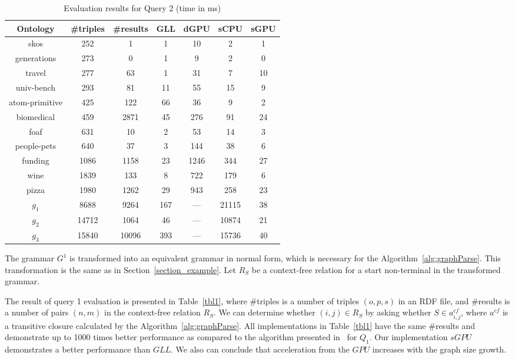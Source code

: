 \begin{table*}[h]
\centering
\caption{Evaluation results for Query 2 (time in ms)}
\label{tbl2}

\begin{tabular}{ | c | c | c | c | c | c | c |}
\hline
Ontology & \#triples & \#results & GLL & dGPU & sCPU & sGPU \\
\hline 
\hline
skos        & 252 & 1 & 1 & 10 & 2 & 1\\
generations & 273 & 0 & 1 & 9 & 2 & 0\\
travel      & 277 & 63 & 1 & 31 & 7 & 10\\
univ-bench  & 293 & 81 & 11 & 55 & 15 & 9\\
atom-primitive & 425 & 122 & 66 & 36 & 9 & 2\\
biomedical & 459 & 2871 & 45 & 276 & 91 & 24\\
foaf        & 631 & 10 & 2 & 53 & 14 & 3\\
people-pets & 640 & 37 & 3 & 144 & 38 & 6\\
funding     & 1086 & 1158 & 23 & 1246 & 344 & 27\\
wine        & 1839 & 133 & 8 & 722 & 179 & 6\\
pizza       & 1980 & 1262 & 29 & 943 & 258 & 23\\
$g_{1}$     & 8688 & 9264 & 167 & --- & 21115 & 38\\
$g_{2}$     & 14712 & 1064 & 46 & --- & 10874 & 21\\
$g_{3}$     & 15840 & 10096 & 393 & --- & 15736 & 40\\
\hline
\end{tabular}

\end{table*}


The grammar $G^1$ is transformed into an equivalent grammar in normal form, which is necessary for the Algorithm~\ref{alg:graphParse}. This transformation is the same as in Section~\ref{section_example}. Let $R_S$ be a context-free relation for a start non-terminal in the transformed grammar.

The result of query 1 evaluation is presented in Table~\ref{tbl1}, where \#triples is a number of triples $(o,p,s)$ in an RDF file, and \#results is a number of pairs $(n,m)$ in the context-free relation $R_S$. We can determine whether $(i,j) \in R_S$ by asking whether $S \in a^{cf}_{i,j}$, where $a^{cf}$ is a transitive closure calculated by the Algorithm~\ref{alg:graphParse}. All implementations in Table~\ref{tbl1} have the same \#results and demonstrate up to 1000 times better performance as compared to the algorithm presented in~\cite{RDF} for $Q_1$. Our implementation $sGPU$ demonstrates a better performance than $GLL$. We also can conclude that acceleration from the $GPU$ increases with the graph size growth.

